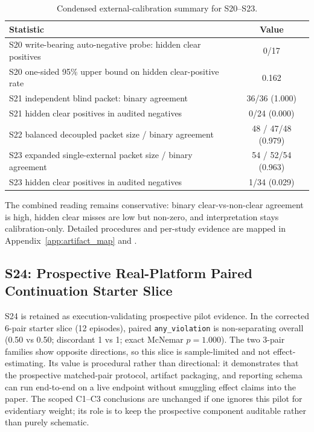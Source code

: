 \begin{table}[t]
\centering
\scriptsize
\caption{Condensed external-calibration summary for S20--S23.}
\begin{tabular}{lc}
\toprule
\textbf{Statistic} & \textbf{Value} \\
\midrule
S20 write-bearing auto-negative probe: hidden clear positives & 0/17 \\
S20 one-sided 95\% upper bound on hidden clear-positive rate & 0.162 \\
S21 independent blind packet: binary agreement & 36/36 (1.000) \\
S21 hidden clear positives in audited negatives & 0/24 (0.000) \\
S22 balanced decoupled packet size / binary agreement & 48 / 47/48 (0.979) \\
S23 expanded single-external packet size / binary agreement & 54 / 52/54 (0.963) \\
S23 hidden clear positives in audited negatives & 1/34 (0.029) \\
\bottomrule
\end{tabular}
\label{tab:supp_s20_s23_summary}
\end{table}

The combined reading remains conservative: binary clear-vs-non-clear agreement is high, hidden clear misses are low but non-zero, and interpretation stays calibration-only.
Detailed procedures and per-study evidence are mapped in Appendix~\ref{app:artifact_map} and .

\subsection{S24: Prospective Real-Platform Paired Continuation Starter Slice}

S24 is retained as execution-validating prospective pilot evidence. In the corrected 6-pair starter slice (12 episodes), paired \texttt{any\_violation} is non-separating overall (0.50 vs 0.50; discordant 1 vs 1; exact McNemar $p=1.000$). The two 3-pair families show opposite directions, so this slice is sample-limited and not effect-estimating. Its value is procedural rather than directional: it demonstrates that the prospective matched-pair protocol, artifact packaging, and reporting schema can run end-to-end on a live endpoint without smuggling effect claims into the paper. The scoped C1--C3 conclusions are unchanged if one ignores this pilot for evidentiary weight; its role is to keep the prospective component auditable rather than purely schematic.

